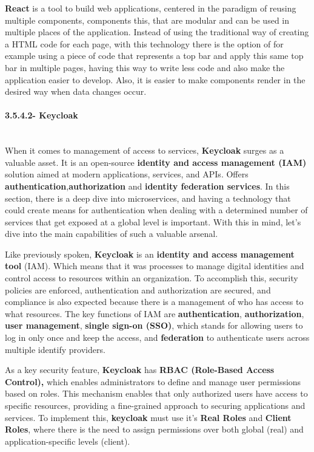 \textbf{React} is a tool to build web applications, centered in the paradigm of reusing multiple components, components this, that are modular and can be used in multiple places of the application. Instead of using the traditional way of creating a HTML code for each page, with this technology there is the option of for example using a piece of code that represents a top bar and apply this same top bar in multiple pages, having this way to write less code and also make the application easier to develop. Also, it is easier to make components render in the desired way when data changes occur. 

\paragraph{3.5.4.2- Keycloak}\mbox{}\\
When it comes to management of access to services, \textbf{Keycloak} surges as a valuable asset. It is an open-source \textbf{identity and access management (IAM)} solution aimed at modern applications, services, and APIs. Offers \textbf{authentication},\textbf{authorization} and \textbf{identity federation services}. In this section, there is a deep dive into microservices, and having a technology that could create means for authentication when dealing with a determined number of services that get exposed at a global level is important. With this in mind, let's dive into the main capabilities of such a valuable arsenal.

Like previously spoken, \textbf{Keycloak} is an \textbf{identity and access management tool} (IAM). Which means that it was processes to manage digital identities and control access to resources within an organization. To accomplish this, security policies are enforced, authentication and authorization are secured, and compliance is also expected because there is a management of who has access to what resources. The key functions of IAM are \textbf{authentication}, \textbf{authorization}, \textbf{user management}, \textbf{single sign-on (SSO)}, which stands for allowing users to log in only once and keep the access, and \textbf{federation} to authenticate users across multiple identify providers.

As a key security feature, \textbf{Keycloak} has \textbf{RBAC (Role-Based Access Control),} which enables administrators to define and manage user permissions based on roles. This mechanism enables that only authorized users have access to specific resources, providing a fine-grained approach to securing applications and services. To implement this, \textbf{keycloak} must use it's \textbf{Real Roles} and \textbf{Client Roles}, where there is the need to assign permissions over both global (real) and application-specific levels (client).


